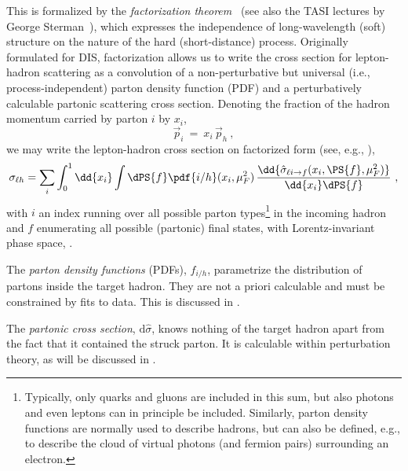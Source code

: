 This is formalized by the \emph{factorization
theorem}~\cite{Collins:1981uw} (see also the TASI lectures by
George Sterman~\cite{Sterman:1995fz}), which expresses the independence of
long-wavelength (soft) structure on the nature of the hard
(short-distance) process. Originally formulated for DIS, factorization
allows us to write the cross section for lepton-hadron scattering as a
convolution of a non-perturbative but universal (i.e.,
process-independent) parton density function (PDF) and a
perturbatively calculable partonic scattering cross section. Denoting
the fraction of the hadron momentum carried by parton $i$ by $x_i$,
\begin{equation}
\vec{p}_i \ = \ x_i\, \vec{p}_h~, \label{eq:x}
\end{equation}
we may write the lepton-hadron cross section on factorized form (see,
e.g., \cite{Brock:1993sz,Dissertori:2003pj}),
\begin{equation}
\sigma_{\ell h} = \sum_i \int_0^1 \dd{x_i}\int\dPS{f}
 \pdf{i/h}(x_i,\mu_F^2)\, \frac{\dd{\hat{\sigma}_{\ell i\to 
 f}(x_i,\PS{f},\mu_F^2)}}{\dd{x_i}\dPS{f}}~, \label{eq:sigmaDis}
\end{equation}
with $i$ an index running over all possible parton
types\footnote{Typically, only quarks and gluons are included in this
sum, but also photons and even leptons can in principle be
included. Similarly, parton density functions are normally used to
describe hadrons, but can also be defined, e.g., to describe the cloud
of virtual photons (and fermion pairs) surrounding an electron.} in the
incoming hadron and $f$ enumerating all possible (partonic) final
states, with Lorentz-invariant phase space, . 

%
The \emph{parton density functions} (PDFs), $f_{i/h}$, parametrize the
distribution of partons inside the target hadron. They are not a priori  
calculable and must be constrained by fits to data. This is discussed in
. 

The \emph{partonic cross section}, $\mathrm{d}{\hat{\sigma}}$, 
knows nothing of the target hadron apart from the fact that it contained
the struck parton. It is calculable within perturbation theory, as will
be discussed in .  

